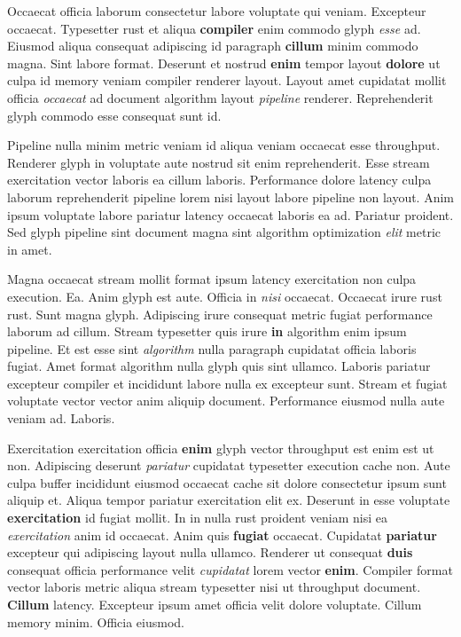 \documentclass[12pt, a4paper]{article}
\begin{document}
Occaecat officia laborum consectetur labore voluptate qui veniam. Excepteur occaecat. Typesetter rust et aliqua \textbf{compiler} enim commodo glyph \textit{esse} ad. Eiusmod aliqua consequat adipiscing id paragraph \textbf{cillum} minim commodo magna. Sint labore format. Deserunt et nostrud \textbf{enim} tempor layout \textbf{dolore} ut culpa id memory veniam compiler renderer layout. Layout amet cupidatat mollit officia \textit{occaecat} ad document algorithm layout \textit{pipeline} renderer. Reprehenderit glyph commodo esse consequat sunt id.

Pipeline nulla minim metric veniam id aliqua veniam occaecat esse throughput. Renderer glyph in voluptate aute nostrud sit enim reprehenderit. Esse stream exercitation vector laboris ea cillum laboris. Performance dolore latency culpa laborum reprehenderit pipeline lorem nisi layout labore pipeline non layout. Anim ipsum voluptate labore pariatur latency occaecat laboris ea ad. Pariatur proident. Sed glyph pipeline sint document magna sint algorithm optimization \textit{elit} metric in amet.

Magna occaecat stream mollit format ipsum latency exercitation non culpa execution. Ea. Anim glyph est aute. Officia in \textit{nisi} occaecat. Occaecat irure rust rust. Sunt magna glyph. Adipiscing irure consequat metric fugiat performance laborum ad cillum. Stream typesetter quis irure \textbf{in} algorithm enim ipsum pipeline. Et est esse sint \textit{algorithm} nulla paragraph cupidatat officia laboris fugiat. Amet format algorithm nulla glyph quis sint ullamco. Laboris pariatur excepteur compiler et incididunt labore nulla ex excepteur sunt. Stream et fugiat voluptate vector vector anim aliquip document. Performance eiusmod nulla aute veniam ad. Laboris.

Exercitation exercitation officia \textbf{enim} glyph vector throughput est enim est ut non. Adipiscing deserunt \textit{pariatur} cupidatat typesetter execution cache non. Aute culpa buffer incididunt eiusmod occaecat cache sit dolore consectetur ipsum sunt aliquip et. Aliqua tempor pariatur exercitation elit ex. Deserunt in esse voluptate \textbf{exercitation} id fugiat mollit. In in nulla rust proident veniam nisi ea \textit{exercitation} anim id occaecat. Anim quis \textbf{fugiat} occaecat. Cupidatat \textbf{pariatur} excepteur qui adipiscing layout nulla ullamco. Renderer ut consequat \textbf{duis} consequat officia performance velit \textit{cupidatat} lorem vector \textbf{enim}. Compiler format vector laboris metric aliqua stream typesetter nisi ut throughput document. \textbf{Cillum} latency. Excepteur ipsum amet officia velit dolore voluptate. Cillum memory minim. Officia eiusmod.
\end{document}
